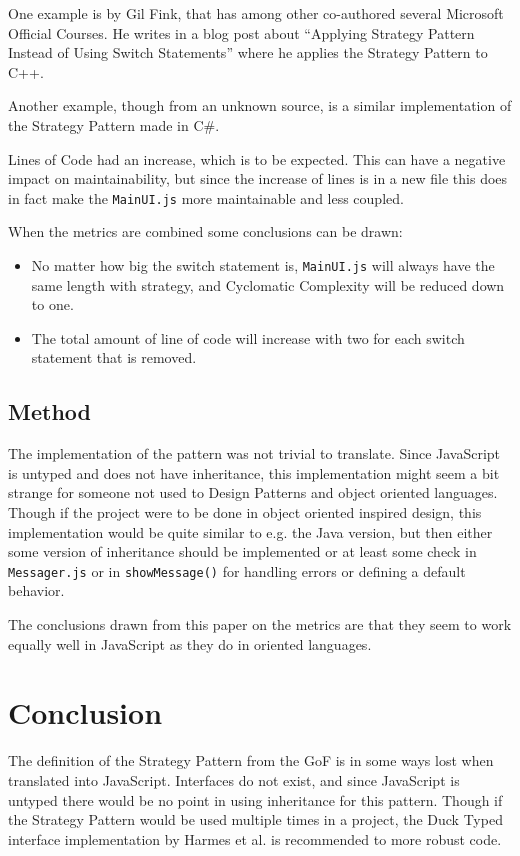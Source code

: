 \documentclass[conference, a4paper]{IEEEtran}
\begin{document}
One example is by Gil Fink, that has among other co-authored several Microsoft Official Courses. He writes in a blog post about ``Applying Strategy Pattern Instead of Using Switch Statements'' where he applies the Strategy Pattern to C++.~\cite{bibitem:GilFink}

Another example, though from an unknown source, is a similar implementation of the Strategy Pattern made in C\#.~\cite{bibitem:CSharp}

Lines of Code had an increase, which is to be expected. This can have a negative impact on maintainability, but since the increase of lines is in a new file this does in fact make the \texttt{MainUI.js} more maintainable and less coupled.

When the metrics are combined some conclusions can be drawn:
\begin{itemize}
	\item No matter how big the switch statement is, \texttt{MainUI.js} will always have the same length with strategy, and Cyclomatic Complexity will be reduced down to one.
	\item The total amount of line of code will increase with two for each switch statement that is removed.
\end{itemize}

\subsection{Method}
The implementation of the pattern was not trivial to translate. Since JavaScript is untyped and does not have inheritance, this implementation might seem a bit strange for someone not used to Design Patterns and object oriented languages. Though if the project were to be done in object oriented inspired design, this implementation would be quite similar to e.g. the Java version, but then either some version of inheritance should be implemented or at least some check in \texttt{Messager.js} or in \texttt{showMessage()} for handling errors or defining a default behavior.

The conclusions drawn from this paper on the metrics are that they seem to work equally well in JavaScript as they do in oriented languages.

\section{Conclusion}
The definition of the Strategy Pattern from the GoF is in some ways lost when translated into JavaScript. Interfaces do not exist, and since JavaScript is untyped there would be no point in using inheritance for this pattern. Though if the Strategy Pattern would be used multiple times in a project, the Duck Typed interface implementation by Harmes et al. is recommended to more robust code.~\cite{bibitem:DiazHarmes}
\end{document}
